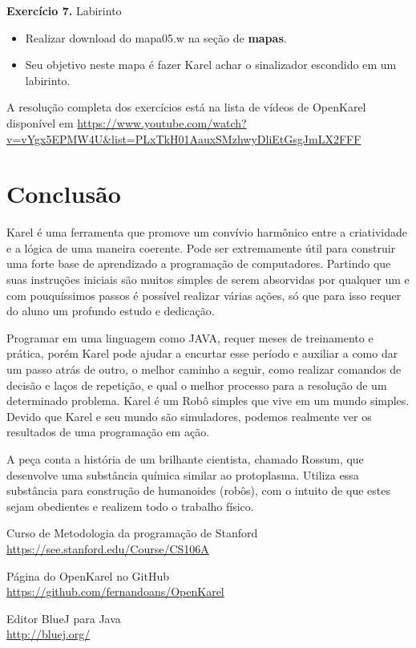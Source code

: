 \documentclass[a4paper,11pt]{article}
\begin{document}
\textbf{Exercício 7.} Labirinto \vspace{-1em}
\begin{itemize}[nolistsep]
	\item Realizar download do mapa05.w na seção de \textbf{mapas}.
	\item Seu objetivo neste mapa é fazer Karel achar o sinalizador escondido em um labirinto.
\end{itemize}

A resolução completa dos exercícios está na lista de vídeos de OpenKarel disponível em \url{https://www.youtube.com/watch?v=vYgx5EPMW4U&list=PLxTkH01AauxSMzhwyDliEtGsgJmLX2FFF}

\section{Conclusão}
Karel é uma ferramenta que promove um convívio harmônico entre a criatividade e a lógica de uma maneira coerente. Pode ser extremamente útil para construir uma forte base de aprendizado a programação de computadores. Partindo que suas instruções iniciais são muitos simples de serem absorvidas por qualquer um e com pouquíssimos passos é possível realizar várias ações, só que para isso requer do aluno um profundo estudo e dedicação.

Programar em uma linguagem como JAVA, requer meses de treinamento e prática, porém Karel pode ajudar a encurtar esse período e auxiliar a como dar um passo atrás de outro, o melhor caminho a seguir, como realizar comandos de decisão e laços de repetição, e qual o melhor processo para a resolução de um determinado problema. Karel é um Robô simples que vive em um mundo simples. Devido que Karel e seu mundo são simuladores, podemos realmente ver os resultados de uma programação em ação. 



\begin{thebibliography}{7}
  A peça conta a história de um brilhante cientista, chamado Rossum, que desenvolve uma substância química similar ao protoplasma. Utiliza essa substância para construção de humanoides (robôs), com o intuito de que estes sejam obedientes e realizem todo o trabalho físico.

  Curso de Metodologia da programação de Stanford \\
  \url{https://see.stanford.edu/Course/CS106A}
  
  Página do OpenKarel no GitHub \\
  \url{https://github.com/fernandoans/OpenKarel}
  
  Editor BlueJ para Java \\
  \url{http://bluej.org/}

  
\end{thebibliography}
  
\end{document}
